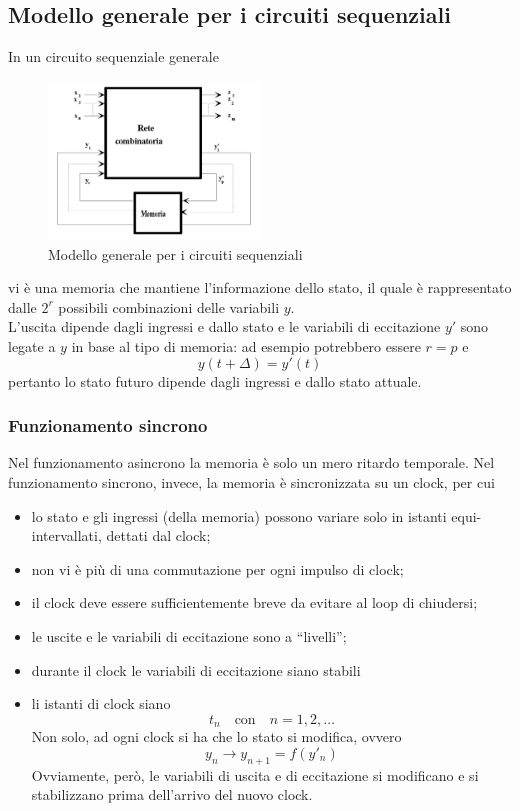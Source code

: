 \documentclass[a4paper]{extarticle}
\newcommand{\quotes}[1]{``#1''}
\begin{document}
\newpage
\noindent
\subsection{Modello generale per i circuiti sequenziali}
In un circuito sequenziale generale 

\begin{figure}[H]
    \centering
    \includegraphics[width=0.5\textwidth]{modello-generale-circuiti-sequenziali.png}
    \caption{Modello generale per i circuiti sequenziali}
    \label{fig:modello_generale_circuiti_sequenziali}
\end{figure}

\noindent
vi è una memoria che mantiene l'informazione dello stato, il quale è rappresentato dalle $2^r$ possibili combinazioni delle variabili $y$.\\
L'uscita dipende dagli ingressi e dallo stato e le variabili di eccitazione $y'$ sono legate a $y$ in base al tipo di memoria: ad esempio potrebbero essere $r=p$ e
\[y(t+\Delta)=y'(t)\]
pertanto lo stato futuro dipende dagli ingressi e dallo stato attuale.

\vspace{1em}
\subsubsection{Funzionamento sincrono}
Nel funzionamento asincrono la memoria è solo un mero ritardo temporale. Nel funzionamento sincrono, invece, la memoria è sincronizzata su un clock, per cui
\begin{itemize}
    \item lo stato e gli ingressi (della memoria) possono variare solo in istanti equi-intervallati, dettati dal clock;
    \item non vi è più di una commutazione per ogni impulso di clock;
    \item il clock deve essere sufficientemente breve da evitare al loop di chiudersi;
    \item le uscite e le variabili di eccitazione sono a \quotes{livelli};
    \item durante il clock le variabili di eccitazione siano stabili
    \item li istanti di clock siano 
    \[t_n \hspace{1em} \text{con} \hspace{1em} n=1,2,\dots\]
    Non solo, ad ogni clock si ha che lo stato si modifica, ovvero
    \[y_n \to y_{n+1} = f(y'_n)\]
    Ovviamente, però, le variabili di uscita e di eccitazione si modificano e si stabilizzano prima dell'arrivo del nuovo clock.
\end{itemize}
\end{document}

